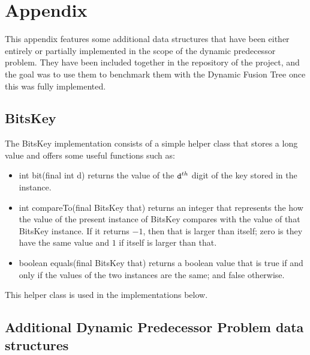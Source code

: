 
\chapter{Appendix} \label{sec:appendix}

This appendix features some additional data structures that have been either entirely or partially implemented in the scope of the dynamic predecessor problem. They have been included together in the repository of the project, and the goal was to use them to benchmark them with the Dynamic Fusion Tree once this was fully implemented.

\section{{\ttfamily BitsKey}}

The {\ttfamily BitsKey} implementation consists of a simple helper class that stores a {\ttfamily long} value and offers some useful functions such as:
\begin{itemize}
    \item
    {\ttfamily int bit(final int d)} returns the value of the $\text{{\ttfamily d}}^{th}$ digit of the key stored in the instance.
    
    \item
    {\ttfamily int compareTo(final BitsKey that)} returns an integer that represents the how the value of the present instance of {\ttfamily BitsKey} compares with the value of {\ttfamily that BitsKey} instance. If it returns $-1$, then {\ttfamily that} is larger than itself; zero is they have the same value and $1$ if itself is larger than {\ttfamily that}.
    
    \item
    {\ttfamily boolean equals(final BitsKey that)} returns a {\ttfamily boolean} value that is {\ttfamily true} if and only if the values of the two instances are the same; and {\ttfamily false} otherwise.
\end{itemize}

This helper class is used in the implementations below.

\section{Additional Dynamic Predecessor Problem data structures}

